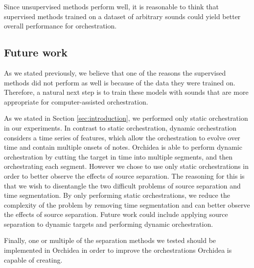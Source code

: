 \documentclass[letterpaper]{article}  %
\begin{document}
  Since unsupervised methods perform well, it is reasonable to think that supervised methods trained on a dataset of arbitrary sounds could yield better overall performance for orchestration.

    \subsection{Future work}\label{sec:futurework}
    As we stated previously, we believe that one of the reasons the supervised methods did not perform as well is because of the data they were trained on. Therefore, a natural next step is to train these models with sounds that are more appropriate for computer-assisted orchestration.


    As we stated in Section \ref{sec:introduction}, we performed only static orchestration in our experiments. In contrast to static orchestration, dynamic orchestration considers a time series of features, which allow the orchestration to evolve over time and contain multiple onsets of notes. Orchidea is able to perform dynamic orchestration by cutting the target in time into multiple segments, and then orchestrating each segment. However we chose to use only static orchestrations in order to better observe the effects of source separation. The reasoning for this is that we wish to disentangle the two difficult problems of source separation and time segmentation. By only performing static orchestrations, we reduce the complexity of the problem by removing time segmentation and can better observe the effects of source separation. Future work could include applying source separation to dynamic targets and performing dynamic orchestration.

    Finally, one or multiple of the separation methods we tested should be implemented in Orchidea in order to improve the orchestrations Orchidea is capable of creating.



\end{document}
